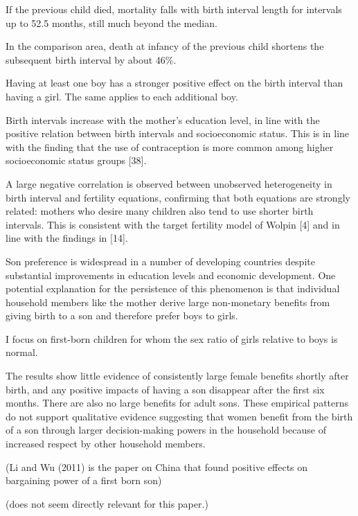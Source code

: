 If the previous child died, mortality falls with birth interval length
for intervals up to 52.5 months, still much beyond the median.

In the comparison area, death at infancy of the previous child shortens
the subsequent birth interval by about 46\%.

Having at least one boy has a stronger positive effect on the birth
interval than having a girl. The same applies to each additional boy.

Birth intervals increase with the mother’s education level, in line with
the positive relation between birth intervals and socioeconomic status.
This is in line with the finding that the use of contraception is more
common among higher socioeconomic status groups [38].

A large negative correlation is observed between unobserved
heterogeneity in birth interval and fertility equations, confirming that
both equations are strongly related: mothers who desire many children
also tend to use shorter birth intervals. This is consistent with the
target fertility model of Wolpin [4] and in line with the findings in
[14].

\citet{Zimmermann2018}

Son preference is widespread in a number of developing countries despite
substantial improvements in education levels and economic development.
One potential explanation for the persistence of this phenomenon is that
individual household members like the mother derive large non-monetary
beneﬁts from giving birth to a son and therefore prefer boys to girls.

I focus on ﬁrst-born children for whom the sex ratio of girls relative to boys is normal.

The results show little evidence of consistently large female beneﬁts
shortly after birth, and any positive impacts of having a son disappear
after the ﬁrst six months. There are also no large beneﬁts for adult
sons. These empirical patterns do not support qualitative evidence
suggesting that women beneﬁt from the birth of a son through larger
decision-making powers in the household because of increased respect by
other household members.

(Li and Wu (2011) is the paper on China that found positive effects on
bargaining power of a first born son)

(does not seem directly relevant for this paper.)

\citet{Conde-Agudelo2012}


